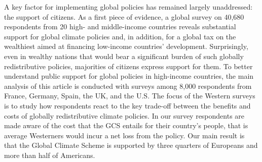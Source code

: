 \documentclass[12pt,english]{article}
\begin{document}
A key factor for implementing global policies has remained largely unaddressed: the support of citizens. As a first piece of evidence, a global survey on 40,680 respondents from 20 high- and middle-income countries reveals substantial support for global climate policies and, in addition, for a global tax on the wealthiest aimed at financing low-income countries' development. Surprisingly, even in wealthy nations that would bear a significant burden of such globally redistributive policies, majorities of citizens express support for them. To better understand public support for global policies in high-income countries, the  main analysis of this article is conducted with surveys among 8,000 respondents from France, Germany, Spain, the UK, and the U.S. 
The focus of the Western surveys is to study how respondents react to the key trade-off between the benefits and costs of globally redistributive climate policies. In our survey respondents are made aware of the cost that the GCS entails for their country's people, that is average Westerners would incur a net loss from the policy. Our main result is that the Global Climate Scheme %
is supported by three quarters of Europeans and more than half of Americans. 
\end{document}
